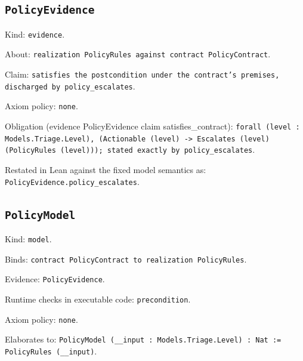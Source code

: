\documentclass[11pt]{article}
\begin{document}
\subsection*{\texttt{PolicyEvidence}}
\noindent Kind: \texttt{evidence}.\par
\noindent About: \texttt{realization PolicyRules against contract PolicyContract}.\par
\noindent Claim: \texttt{satisfies the postcondition under the contract's premises, discharged by policy\_escalates}.\par
\noindent Axiom policy: \texttt{none}.\par
\noindent Obligation (evidence PolicyEvidence claim satisfies\_contract): \texttt{forall (level : Models.Triage.Level), (Actionable (level) -> Escalates (level) (PolicyRules (level))); stated exactly by policy\_escalates}.\par
\noindent Restated in Lean against the fixed model semantics as: \texttt{PolicyEvidence.policy\_escalates}.\par
\subsection*{\texttt{PolicyModel}}
\noindent Kind: \texttt{model}.\par
\noindent Binds: \texttt{contract PolicyContract to realization PolicyRules}.\par
\noindent Evidence: \texttt{PolicyEvidence}.\par
\noindent Runtime checks in executable code: \texttt{precondition}.\par
\noindent Axiom policy: \texttt{none}.\par
\noindent Elaborates to: \texttt{PolicyModel (\_\_input : Models.Triage.Level) : Nat := PolicyRules (\_\_input)}.\par
\end{document}
